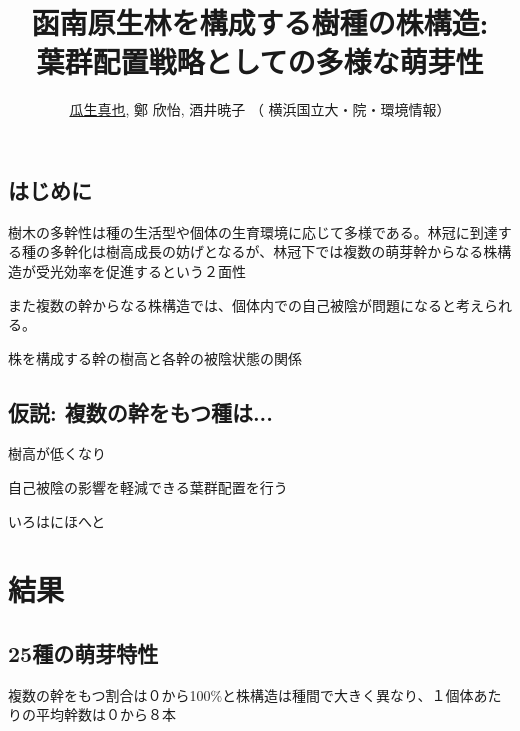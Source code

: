 \documentclass[a0, 30pt, plainboxedsections]{sciposter} %
\title{函南原生林を構成する樹種の株構造:\\\Huge{葉群配置戦略としての多様な萌芽性}}
\author{\Large{\faUser \hspace{0.02em} \underline{瓜生真也}, 鄭 欣怡, 酒井暁子 （\faUniv \hspace{0.02em} 横浜国立大・院・環境情報） \normalsize{\faEnvelope \hspace{0.02em} \textit{\fontspec{Times New Roman}{suika1127@gmail.com}}}}}
\begin{document}
\maketitle
\begin{multicols}{2}

\section*{\huge{はじめに}}

樹木の多幹性は種の生活型や個体の生育環境に応じて多様である。林冠に到達する種の多幹化は樹高成長の妨げとなるが、林冠下では複数の萌芽幹からなる株構造が受光効率を促進するという２面性

また複数の幹からなる株構造では、個体内での自己被陰が問題になると考えられる。

株を構成する幹の樹高と各幹の被陰状態の関係

\subsection*{仮説: 複数の幹をもつ種は...}

\begin{list}{}{\setlength{\itemindent}{1em}} %
 \item 樹高が低くなり
 \item 自己被陰の影響を軽減できる葉群配置を行う
\end{list}

\begin{mdframed}[roundcorner=5pt, align=left, backgroundcolor=Orange1]
  \centering\huge{\color{white}{まとめ}}
  
  \flushleft\normalsize{いろはにほへと}
\end{mdframed}



\end{multicols}

\section*{\huge{結果}}

\subsection*{25種の萌芽特性}

複数の幹をもつ割合は０から100\%と株構造は種間で大きく異なり、１個体あたりの平均幹数は０から８本
\end{document}
